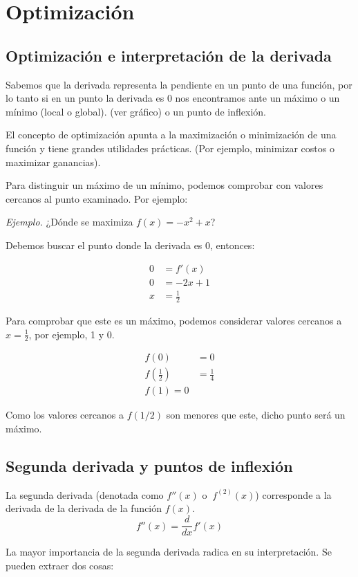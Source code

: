 \documentclass[spanish,12pt]{article}
\begin{document}
\section{Optimización}
\subsection{Optimización e interpretación de la derivada}

Sabemos que la derivada representa la pendiente en un punto de una función, por lo tanto si en un punto la derivada es 0 nos encontramos ante un máximo o un mínimo (local o global). (ver gráfico) o un punto de inflexión.

El concepto de optimización apunta a la maximización o minimización de una función y tiene grandes utilidades prácticas. (Por ejemplo, minimizar costos o maximizar ganancias).

Para distinguir un máximo de un mínimo, podemos comprobar con valores cercanos al punto examinado. Por ejemplo:

\textit{Ejemplo.} ¿Dónde se maximiza $f(x)=-x^2+x$?

Debemos buscar el punto donde la derivada es 0, entonces:

\begin{align*}
    0&=f'(x)\\
    0&=-2x+1\\
    x&=\frac{1}{2}
\end{align*}

Para comprobar que este es un máximo, podemos considerar valores cercanos a $x=\frac{1}{2}$, por ejemplo, 1 y 0.

\begin{align*}
    f(0)&=0\\
    f\left(\frac{1}{2}\right)&=\frac{1}{4}\\
    f(1)=0
\end{align*}

Como los valores cercanos a $f(1/2)$ son menores que este, dicho punto será un máximo.

\subsection{Segunda derivada y puntos de inflexión}
La segunda derivada (denotada como $f''(x)\text{ o }\ f^{(2)}(x)$) corresponde a la derivada de la derivada de la función $f(x)$.
$$f''(x)=\frac{d}{dx}f'(x)$$

La mayor importancia de la segunda derivada radica en su interpretación. Se pueden extraer dos cosas:
\end{document}

